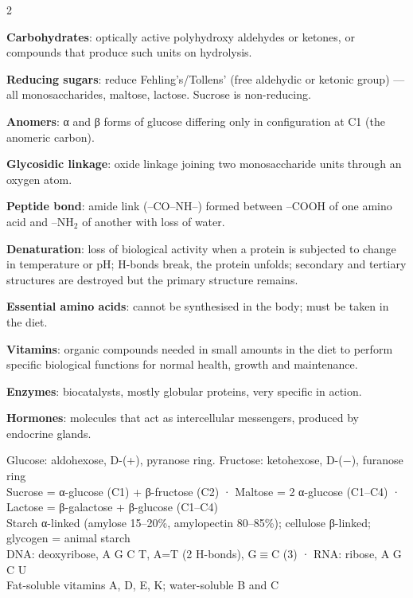 \documentclass[10pt,a4paper]{extarticle}
\begin{document}
\begin{multicols}{2}
\begin{fl}
\item \textbf{Carbohydrates}: optically active polyhydroxy aldehydes or ketones, or compounds that produce such units on hydrolysis.
\item \textbf{Reducing sugars}: reduce Fehling's/Tollens' (free aldehydic or ketonic group) — all monosaccharides, maltose, lactose. Sucrose is non-reducing.
\item \textbf{Anomers}: α and β forms of glucose differing only in configuration at C1 (the anomeric carbon).
\item \textbf{Glycosidic linkage}: oxide linkage joining two monosaccharide units through an oxygen atom.
\item \textbf{Peptide bond}: amide link (--CO--NH--) formed between --COOH of one amino acid and --NH$_2$ of another with loss of water.
\item \textbf{Denaturation}: loss of biological activity when a protein is subjected to change in temperature or pH; H-bonds break, the protein unfolds; secondary and tertiary structures are destroyed but the primary structure remains.
\item \textbf{Essential amino acids}: cannot be synthesised in the body; must be taken in the diet.
\item \textbf{Vitamins}: organic compounds needed in small amounts in the diet to perform specific biological functions for normal health, growth and maintenance.
\item \textbf{Enzymes}: biocatalysts, mostly globular proteins, very specific in action.
\item \textbf{Hormones}: molecules that act as intercellular messengers, produced by endocrine glands.
\end{fl}

\begin{kbox}
Glucose: aldohexose, D-(+), pyranose ring. Fructose: ketohexose, D-($-$), furanose ring\\
Sucrose = α-glucose (C1) + β-fructose (C2) · Maltose = 2 α-glucose (C1--C4) · Lactose = β-galactose + β-glucose (C1--C4)\\
Starch α-linked (amylose 15--20\%, amylopectin 80--85\%); cellulose β-linked; glycogen = animal starch\\
DNA: deoxyribose, A G C T, A=T (2 H-bonds), G$\equiv$C (3) · RNA: ribose, A G C U\\
Fat-soluble vitamins A, D, E, K; water-soluble B and C
\end{kbox}


\end{multicols}
\end{document}
